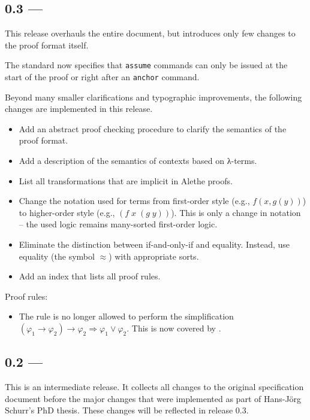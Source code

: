 \subsection*{0.3 --- }

This release overhauls the entire document, but introduces only few
changes to the proof format itself.

The standard now specifies that \texttt{assume} commands can only be
issued at the start of the proof or right after an \texttt{anchor}
command.

Beyond many smaller clarifications and typographic improvements, the
following changes are implemented in this release.
\begin{itemize}
  \item Add an abstract proof checking procedure to clarify
  the semantics of the proof format.
  \item Add a description of the semantics of contexts based on λ-terms.
  \item List all transformations that are implicit in Alethe proofs.
  \item Change the notation used for terms from first-order style
   (e.g., $f(x,g(y))$) to higher-order style (e.g.,
   $(f\;x\;(g\;y))$).  This is only a change in notation -- the used logic
   remains many-sorted first-order logic.
  \item Eliminate the distinction between if-and-only-if and
  equality.  Instead, use equality (the symbol $≈$) with appropriate
   sorts.
  \item Add an index that lists all proof rules.
\end{itemize}

Proof rules:
\begin{itemize}
  \item The rule  is no longer allowed to
  perform the simplification $(\varphi_1\rightarrow \varphi_2)\rightarrow \varphi_2
  ⇒  \varphi_1\lor \varphi_2$.  This is now covered by .
\end{itemize}

\subsection*{0.2 --- }

This is an intermediate release.  It collects all changes to the original
specification document before the major changes that were implemented as
part of Hans-Jörg Schurr's PhD thesis.   These changes will be reflected
in release 0.3.

